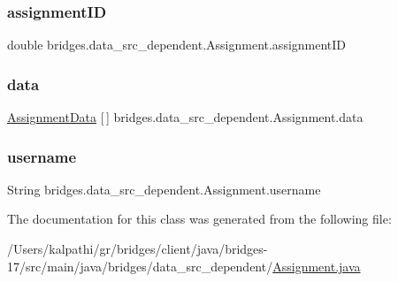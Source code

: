 \subsubsection{\texorpdfstring{assignment\+ID}{assignmentID}}
{\footnotesize\ttfamily double bridges.\+data\+\_\+src\+\_\+dependent.\+Assignment.\+assignment\+ID}

\mbox{\label{classbridges_1_1data__src__dependent_1_1_assignment_a23d503c5e6eae939bb8262dc8e18c259}} 
\subsubsection{\texorpdfstring{data}{data}}
{\footnotesize\ttfamily \mbox{\hyperlink{classbridges_1_1data__src__dependent_1_1_assignment_data}{Assignment\+Data}} \mbox{[}$\,$\mbox{]} bridges.\+data\+\_\+src\+\_\+dependent.\+Assignment.\+data}

\mbox{\label{classbridges_1_1data__src__dependent_1_1_assignment_aa7326ba8e0eb02fff4e5b22e4b89e61d}} 
\subsubsection{\texorpdfstring{username}{username}}
{\footnotesize\ttfamily String bridges.\+data\+\_\+src\+\_\+dependent.\+Assignment.\+username}



The documentation for this class was generated from the following file\+:\begin{DoxyCompactItemize}
\item 
/\+Users/kalpathi/gr/bridges/client/java/bridges-\/17/src/main/java/bridges/data\+\_\+src\+\_\+dependent/\mbox{\hyperlink{_assignment_8java}{Assignment.\+java}}\end{DoxyCompactItemize}
